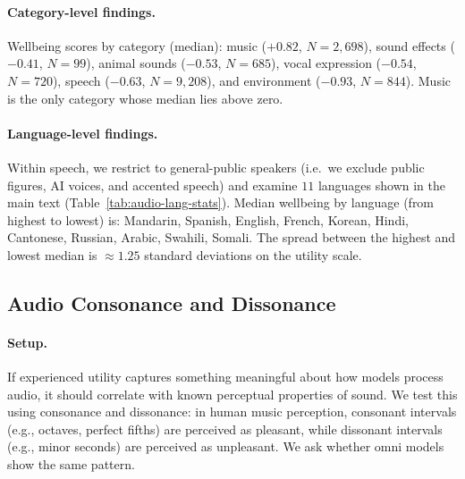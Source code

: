 \paragraph{Category-level findings.}
Wellbeing scores by category (median): music ($+0.82$, $N{=}2{,}698$), sound effects ($-0.41$, $N{=}99$), animal sounds ($-0.53$, $N{=}685$), vocal expression ($-0.54$, $N{=}720$), speech ($-0.63$, $N{=}9{,}208$), and environment ($-0.93$, $N{=}844$). Music is the only category whose median lies above zero.

\paragraph{Language-level findings.}
Within speech, we restrict to general-public speakers (i.e.\ we exclude public figures, AI voices, and accented speech) and examine $11$ languages shown in the main text (Table~\ref{tab:audio-lang-stats}). Median wellbeing by language (from highest to lowest) is: Mandarin, Spanish, English, French, Korean, Hindi, Cantonese, Russian, Arabic, Swahili, Somali. The spread between the highest and lowest median is ${\approx}1.25$ standard deviations on the utility scale.


\subsection{Audio Consonance and Dissonance}
\label{app:consonance}

\paragraph{Setup.}
If experienced utility captures something meaningful about how models process audio, it should correlate with known perceptual properties of sound. We test this using consonance and dissonance: in human music perception, consonant intervals (e.g., octaves, perfect fifths) are perceived as pleasant, while dissonant intervals (e.g., minor seconds) are perceived as unpleasant. We ask whether omni models show the same pattern.

